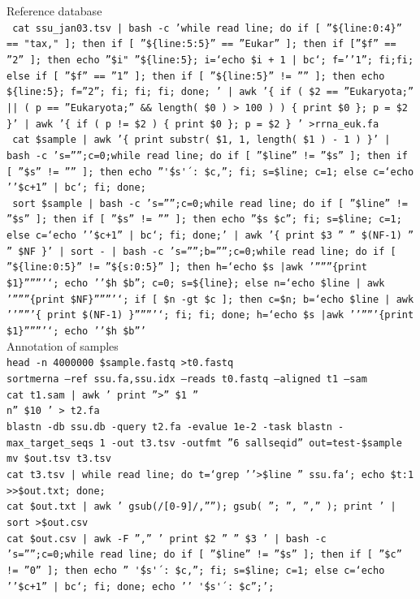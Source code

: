 \documentclass[a4paper]{article}
\begin{document}
Reference database\\
\texttt{\tiny{ cat ssu\_jan03.tsv | bash -c 'while read line; do if [ ''\$\{line:0:4\}'' == "tax," ]; then if [ ''\$\{line:5:5\}'' == ''Eukar'' ]; then if [''\$f'' == ''2'' ]; then echo ''\$i" ''\$\{line:5\}; i=`echo \$i + 1 | bc`; f=''1''; fi;fi;  else if [ ''\$f'' == ''1'' ]; then if [ ''\$\{line:5\}'' != '''' ]; then echo \$\{line:5\}; f=''2''; fi; fi; fi; done; ' | awk '\{ if ( \$2 == ''Eukaryota;'' || ( p == ''Eukaryota;'' \&\& length( \$0 ) > 100 ) ) \{ print \$0 \}; p = \$2 \}' | awk '\{ if ( p != \$2 ) \{ print \$0 \}; p = \$2 \} ' >rrna\_euk.fa }} \\
\texttt{\tiny{ cat \$sample | awk '\{ print substr( \$1, 1, length( \$1 ) - 1 ) \}' | bash -c 's='''';c=0;while read line; do if [ ''\$line'' != ''\$s'' ]; then if [ ''\$s'' != '''' ]; then echo ''\''\$s\'' : \$c,''; fi; s=\$line; c=1; else c=`echo ''\$c+1'' | bc`; fi; done; }} \\
\texttt{\tiny{ sort \$sample |  bash -c 's='''';c=0;while read line; do if [ ''\$line'' != ''\$s'' ]; then if [ ''\$s'' != '''' ]; then echo ''\$s \$c''; fi; s=\$line; c=1; else c=`echo ''\$c+1'' | bc`; fi; done;' | awk '\{ print \$3 '' '' \$(NF-1) '' '' \$NF \}' | sort - | bash -c 's='''';b='''';c=0;while read line; do if [ ''\$\{line:0:5\}'' != ''\$\{s:0:5\}'' ]; then h=`echo \$s |awk '''''''\{print \$1\}'''''''`; echo ''\$h \$b''; c=0; s=\$\{line\}; else n=`echo \$line | awk '''''''\{print \$NF\}'''''''`; if [ \$n -gt \$c ]; then c=\$n; b=`echo \$line | awk '''''''\{ print \$(NF-1) \}'''''''`; fi; fi; done; h=`echo \$s |awk '''''''\{print \$1\}'''''''`; echo ''\$h \$b''' }} \\

Annotation of samples\\
\texttt{\tiny{head -n 4000000 \$sample.fastq >t0.fastq}} \\
\texttt{\tiny{sortmerna --ref ssu.fa,ssu.idx --reads t0.fastq --aligned t1 --sam}} \\
\texttt{\tiny{cat t1.sam | awk '{ print ''>'' \$1 ''\\n'' \$10 }' > t2.fa}} \\
\texttt{\tiny{blastn -db ssu.db -query t2.fa -evalue 1e-2 -task blastn -max\_target\_seqs 1 -out t3.tsv -outfmt ''6 sallseqid'' out=test-\${sample}}} \\
\texttt{\tiny{mv \${out}.tsv t3.tsv }} \\
\texttt{\tiny{cat t3.tsv | while read line; do t=`grep ''>\$line '' ssu.fa`; echo \${t:1} >>\$out.txt; done; }} \\
\texttt{\tiny{cat \$out.txt | awk '{ gsub(/[0-9]/,''''); gsub( ''; '', '','' ); print }' | sort >\${out}.csv }} \\
\texttt{\tiny{cat \$out.csv | awk -F '','' '{ print \$2 '' '' \$3 }' | bash -c 's='''';c=0;while read line; do if [ ''\$line'' != ''\$s'' ]; then if [ ''\$c'' != ''0'' ]; then echo ''  \''\$s\'' : \$c,''; fi; s=\$line; c=1; else c=`echo ''\$c+1'' | bc`; fi; done; echo ''  \''\$s\'' : \$c'';'; }} \\
\end{document}
